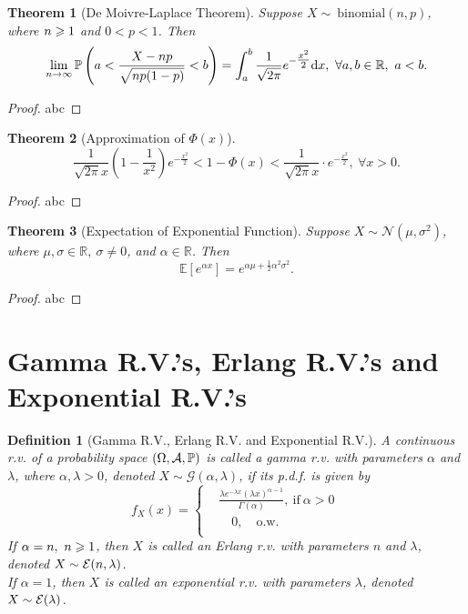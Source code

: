 \documentclass[openany,12pt]{book}
\newtheorem{theorem}{Theorem}[chapter]
\newtheorem{definition}{Definition}[chapter]
\begin{document}
\begin{theorem}[De Moivre-Laplace Theorem]
Suppose $X\sim\ \mathrm{binomial}(n,p)$, where $n\geqslant1$ and $0<p<1$. Then
\[\lim_{n \to \infty}{\mathbb{P}\left( a < \frac{X - np}{\sqrt{np( 1 - p )}} < b \right) = \int_{a}^{b}\frac{1}{\sqrt{2\pi}}}e^{- \tfrac{x^{2}}{2}}\mathrm{d} x,\ \forall a,b \in \mathbb{R},\ a < b.\]
\end{theorem}

\begin{proof}
  abc
\end{proof}

\begin{theorem}[Approximation of $\Phi(x)$]
\[\frac{1}{\sqrt{2\pi}x}\left( 1 - \frac{1}{x^{2}} \right)e^{- \tfrac{{x}^{2}}{2}} < 1 - \Phi(x) < \frac{1}{\sqrt{2\pi}x} \cdot e^{- \tfrac{{x}^{2}}{2}},\ \forall x > 0.\]
\end{theorem}

\begin{proof}
  abc
\end{proof}

\begin{theorem}[Expectation of Exponential Function]
Suppose $X\sim \mathcal{N}(\mu,\sigma^2)$, where $\mu,\sigma\in\mathbb{R},\ \sigma\neq0$, and $\alpha\in\mathbb{R}$.
Then 
$$
\mathbb{E}\left[e^{\alpha x}\right]=e^{\alpha\mu+\tfrac{1}{2}\alpha^2\sigma^2}.
$$
\end{theorem}

\begin{proof}
  abc
\end{proof}

\section{Gamma R.V.'s, Erlang R.V.'s and Exponential R.V.'s}

\begin{definition}[Gamma R.V., Erlang R.V. and Exponential R.V.]
A continuous r.v. of a probability space $(\Omega,\mathcal{A},\mathbb{P})$ is called a gamma r.v. with parameters $\alpha$ and $\lambda$, where $\alpha,\lambda>0$, denoted $X\sim \mathcal{G}(\alpha,\lambda)$, if its p.d.f. is given by
\[f_{X}(x) = \left\{ \begin{aligned}
&\frac{\lambda e^{- \lambda x}{(\lambda x)}^{\alpha - 1}}{\Gamma( \alpha )},\ \mathrm{\text{if}}\ \alpha > 0 \\
&\quad0,\quad\mathrm{\text{o.w.}} \\
\end{aligned} \right.\ \]
If $\alpha=n,\ n\geqslant1$, then $X$ is called an Erlang r.v. with parameters $n$ and $\lambda$, denoted $X\sim\mathcal{E}(n,\lambda)$.\\
If $\alpha=1$, then $X$ is called an exponential r.v. with parameters $\lambda$, denoted $X\sim\mathcal{E}(\lambda)$.
\end{definition}
\end{document}
